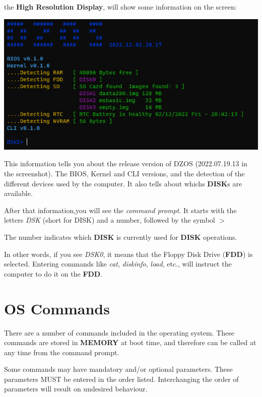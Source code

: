 \documentclass[a4paper,11pt]{article}
\begin{document}
    the \textbf{High Resolution Display}, will show some information on the
    screen:

    \includegraphics[scale=0.6]{dzOS.png}

    This information tells you about the release version of DZOS (2022.07.19.13
    in the screenshot). The BIOS, Kernel and CLI versions, and the detection of
    the different devices used by the computer. It also tells about whichs 
    \textbf{DISK}s are available.

    After that information,you will see the \textit{command prompt}. It starts
    with the letters \textit{DSK} (short for DISK) and a number, followed by the
    symbol $>$

    The number indicates which \textbf{DISK} is currently used for \textbf{DISK}
    operations.

    In other words, if you see \textit{DSK0}, it means that the Floppy Disk Drive
    (\textbf{FDD}) is selected. Entering commands like \textit{cat},
    \textit{diskinfo}, \textit{load}, etc., will instruct the computer to do it
    on the \textbf{FDD}.

    \pagebreak
    \section{OS Commands}
    There are a number of commands included in the operating system. These
    commands are stored in \textbf{MEMORY} at boot time, and therefore can be
    called at any time from the command prompt.

    Some commands may have mandatory and/or optional parameters. These
    parameters MUST be entered in the order listed. Interchanging the order of
    parameters will result on undesired behaviour.
\end{document}
